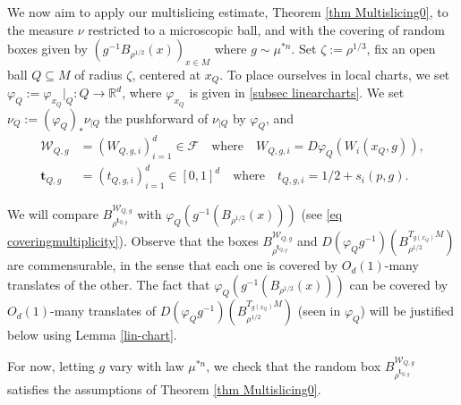 \documentclass[11pt, leqno, fleqn]{amsart}
\def\cW{\mathcal W}
\newcommand{\margem}[1]{\marginpar{{\scriptsize {#1}}}}
\def\cF{          \mathcal F}
\def\clo{   \color{orange}}
\newcommand{\SectionSymbol}{\textsection}
\def\bt{        \mathbf{t}}
\def \R{{\mathbb R}}
\theoremstyle{definition}
\theoremstyle{definition}
\begin{document}
		We now aim to apply our multislicing estimate, Theorem \ref{thm Multislicing0},  to the measure  $ \nu$ restricted to a microscopic ball,   and with the covering of random  boxes given by 
		$(g^{-1}B_{\rho^{1/2}}(x))_{x\in M}$  where $g\sim \mu^{* n}$.   Set $\zeta:=\rho^{1/3}$, fix an open ball  $Q\subseteq M$  of radius $\zeta$, centered at $x_{Q}$.
	 To place ourselves in local charts,  we set $\varphi_{Q} := \varphi_{x_Q} |_Q : Q\rightarrow \R^d$, where $ \varphi_{x_Q}$ is given in \SectionSymbol \ref{subsec	linearcharts}. 
		  We set $\nu_{Q}:=(\varphi_{Q})_{*}\nu_{|Q}$ the pushforward of $\nu_{|Q}$ by $\varphi_{Q}$, and 
		\begin{align*}
      \cW_{Q, g} &= (W_{Q, g, i})_{i=1}^d \in \cF \quad \text{where} \quad W_{Q, g, i}= D\varphi_{Q}( W_{i}(x_{Q}, g) ),  \\
        \bt_{Q, g} &=  (t_{Q, g, i})_{i=1}^d \in [0,1]^d \quad \text{where} \quad t_{Q, g, i}= 1/2 + s_{i}(p,g).
     	\end{align*}
	
	

We will compare $B^{  \cW_{Q, g}}_{\rho^{\bt_{Q, g}}}$   with $\varphi_Q  (g^{-1}(B_{\rho^{1/2}}(x)))$ (see \eqref{eq coveringmultiplicity}).
	Observe that  the boxes  $B^{  \cW_{Q, g}}_{\rho^{\bt_{Q, g}}}$  and $D( \varphi_{Q} g^{-1})( B^{T_{g( x_{Q} )}M}_{\rho^{1/2}} )$      are commensurable, in the sense that each one is covered by $O_{d}(1)$-many translates of the other. 
 The fact that $\varphi_Q  (g^{-1}(B_{\rho^{1/2}}(x)))$ can be covered by $O_d(1)$-many translates of $D( \varphi_{Q} g^{-1})( B^{T_{g( x_{Q} )}M}_{\rho^{1/2}} )$   (seen in $\varphi_{Q}$) will be justified below using Lemma \ref{lin-chart}. 
	
	
	
	For now, letting $g$ vary with law $\mu^{*n}$, we   check that the random box $B^{  \cW_{Q, g}}_{\rho^{\bt_{Q, g}}}$ satisfies the assumptions of Theorem \ref{thm Multislicing0}. 
	
\end{document}
